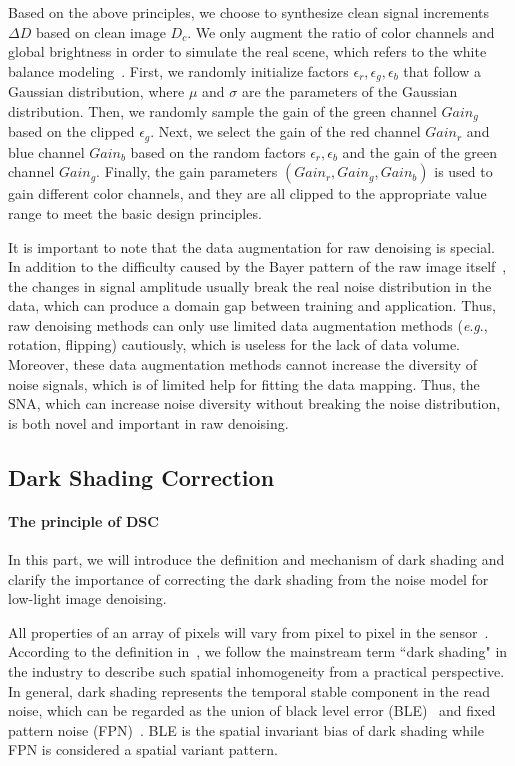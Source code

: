 \documentclass[sigconf,screen,nonacm]{acmart}
\newcommand{\eg}{\textit{e}.\textit{g}.}
\begin{document}
Based on the above principles, we choose to synthesize clean signal increments $\Delta D$ based on clean image $D_{c}$. We only augment the ratio of color channels and global brightness in order to simulate the real scene, which refers to the white balance modeling~\cite{CVPR19/Unprocess}.
    First, we randomly initialize factors $\epsilon_{r},\epsilon_{g},\epsilon_{b}$ that follow a Gaussian distribution, where $\mu$ and $\sigma$ are the parameters of the Gaussian distribution.
    Then, we randomly sample the gain of the green channel $Gain_{g}$ based on the clipped $\epsilon_{g}$.
    Next, we select the gain of the red channel $Gain_{r}$ and blue channel $Gain_{b}$ based on the random factors $\epsilon_{r}, \epsilon_{b}$ and the gain of the green channel $Gain_{g}$.
    Finally, the gain parameters $(Gain_{r}, Gain_{g}, Gain_{b})$ is used to gain different color channels, and they are all clipped to the appropriate value range to meet the basic design principles.



It is important to note that the data augmentation for raw denoising is special.
In addition to the difficulty caused by the Bayer pattern of the raw image itself~\cite{CVPRW19/fhq}, the changes in signal amplitude usually break the real noise distribution in the data, which can produce a domain gap between training and application.
Thus, raw denoising methods can only use limited data augmentation methods (\eg, rotation, flipping) cautiously, which is useless for the lack of data volume. Moreover, these data augmentation methods cannot increase the diversity of noise signals, which is of limited help for fitting the data mapping.
Thus, the SNA, which can increase noise diversity without breaking the noise distribution, is both novel and important in raw denoising.
    
  \subsection{Dark Shading Correction}
  \label{DSC}
    \paragraph{\textbf{The principle of DSC}}
In this part, we will introduce the definition and mechanism of dark shading and clarify the importance of correcting the dark shading from the noise model for low-light image denoising.

    All properties of an array of pixels will vary from pixel to pixel in the sensor~\cite{EMVA1288}.
    According to the definition in~\cite{darkshading}, we follow the mainstream term ``dark shading" in the industry to describe such spatial inhomogeneity from a practical perspective.
    In general, dark shading represents the temporal stable component in the read noise, which can be regarded as the union of black level error (BLE)~\cite{ICME21/RethinkNM, TPAMI21/ELD, nakamura2017image} and fixed pattern noise (FPN)~\cite{EMVA1288,TIP01/FPNR,TIP14/FPNR,arxiv2014/CMOS,2011/CMOS}.
BLE is the spatial invariant bias of dark shading while FPN is considered a spatial variant pattern.
\end{document}

